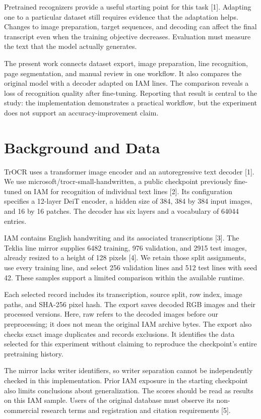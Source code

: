 \documentclass[conference]{IEEEtran}
\begin{document}
Pretrained recognizers provide a useful starting point for this task [1]. Adapting one to a particular dataset still requires evidence that the adaptation helps. Changes to image preparation, target sequences, and decoding can affect the final transcript even when the training objective decreases. Evaluation must measure the text that the model actually generates.

The present work connects dataset export, image preparation, line recognition, page segmentation, and manual review in one workflow. It also compares the original model with a decoder adapted on IAM lines. The comparison reveals a loss of recognition quality after fine-tuning. Reporting that result is central to the study: the implementation demonstrates a practical workflow, but the experiment does not support an accuracy-improvement claim.
\section{Background and Data}
TrOCR uses a transformer image encoder and an autoregressive text decoder [1]. We use microsoft/trocr-small-handwritten, a public checkpoint previously fine-tuned on IAM for recognition of individual text lines [2]. Its configuration specifies a 12-layer DeiT encoder, a hidden size of 384, 384 by 384 input images, and 16 by 16 patches. The decoder has six layers and a vocabulary of 64044 entries.

IAM contains English handwriting and its associated transcriptions [3]. The Teklia line mirror supplies 6482 training, 976 validation, and 2915 test images, already resized to a height of 128 pixels [4]. We retain those split assignments, use every training line, and select 256 validation lines and 512 test lines with seed 42. These samples support a limited comparison within the available runtime.

Each selected record includes its transcription, source split, row index, image paths, and SHA-256 pixel hash. The export saves decoded RGB images and their processed versions. Here, raw refers to the decoded images before our preprocessing; it does not mean the original IAM archive bytes. The export also checks exact image duplicates and records exclusions. It identifies the data selected for this experiment without claiming to reproduce the checkpoint's entire pretraining history.

The mirror lacks writer identifiers, so writer separation cannot be independently checked in this implementation. Prior IAM exposure in the starting checkpoint also limits conclusions about generalization. The scores should be read as results on this IAM sample. Users of the original database must observe its non-commercial research terms and registration and citation requirements [5].
\end{document}
